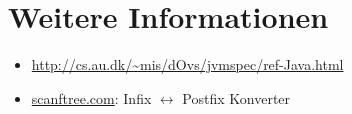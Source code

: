 \section{Weitere Informationen}
\begin{itemize}
    \item \url{http://cs.au.dk/~mis/dOvs/jvmspec/ref-Java.html}
    \item \href{http://scanftree.com/Data_Structure/prefix-postfix-infix-online-converter}{scanftree.com}:
          Infix $\leftrightarrow$ Postfix Konverter
\end{itemize}
